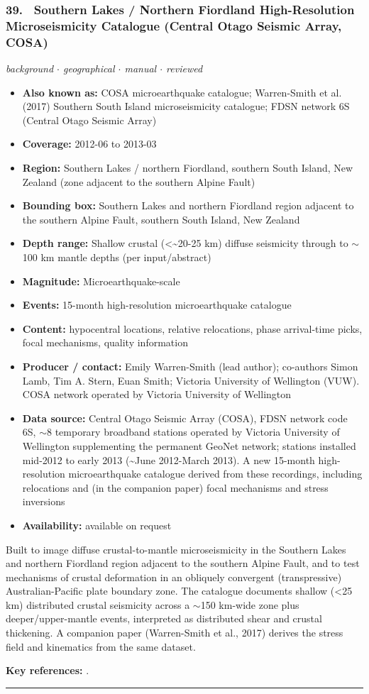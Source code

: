 \documentclass[10pt,a4paper]{article}
\newcommand{\catentryrule}{\par\vspace{3pt}\noindent\textcolor{rulegrey}{\rule{\linewidth}{0.3pt}}\par\vspace{5pt}}
\newcommand{\kv}[2]{\item \textbf{#1:} #2}
\begin{document}
\subsubsection*{\hypertarget{c:39}{39.}~ Southern Lakes / Northern Fiordland High-Resolution Microseismicity Catalogue (Central Otago Seismic Array, COSA)}
{\small\itshape background $\cdot$ geographical $\cdot$ manual $\cdot$ reviewed}\par\vspace{2pt}
\begin{itemize}[leftmargin=1.3em,itemsep=0.6pt,topsep=1pt,parsep=0pt]
\kv{Also known as}{COSA microearthquake catalogue; Warren-Smith et al. (2017) Southern South Island microseismicity catalogue; FDSN network 6S (Central Otago Seismic Array)}
\kv{Coverage}{2012-06 to 2013-03}
\kv{Region}{Southern Lakes / northern Fiordland, southern South Island, New Zealand (zone adjacent to the southern Alpine Fault)}
\kv{Bounding box}{Southern Lakes and northern Fiordland region adjacent to the southern Alpine Fault, southern South Island, New Zealand}
\kv{Depth range}{Shallow crustal (\textless{}\textasciitilde{}20-25 km) diffuse seismicity through to $\sim$100 km mantle depths (per input/abstract)}
\kv{Magnitude}{Microearthquake-scale}
\kv{Events}{15-month high-resolution microearthquake catalogue}
\kv{Content}{hypocentral locations, relative relocations, phase arrival-time picks, focal mechanisms, quality information}
\kv{Producer / contact}{Emily Warren-Smith (lead author); co-authors Simon Lamb, Tim A. Stern, Euan Smith; Victoria University of Wellington (VUW). COSA network operated by Victoria University of Wellington}
\kv{Data source}{Central Otago Seismic Array (COSA), FDSN network code 6S, $\sim$8 temporary broadband stations operated by Victoria University of Wellington supplementing the permanent GeoNet network; stations installed mid-2012 to early 2013 (\textasciitilde{}June 2012-March 2013). A new 15-month high-resolution microearthquake catalogue derived from these recordings, including relocations and (in the companion paper) focal mechanisms and stress inversions}
\kv{Availability}{available on request}
\end{itemize}
\par\vspace{2pt}Built to image diffuse crustal-to-mantle microseismicity in the Southern Lakes and northern Fiordland region adjacent to the southern Alpine Fault, and to test mechanisms of crustal deformation in an obliquely convergent (transpressive) Australian-Pacific plate boundary zone. The catalogue documents shallow (\textless{}25 km) distributed crustal seismicity across a $\sim$150 km-wide zone plus deeper/upper-mantle events, interpreted as distributed shear and crustal thickening. A companion paper (Warren-Smith et al., 2017) derives the stress field and kinematics from the same dataset.
\par\vspace{2pt}\textbf{Key references:} \cite{WarrenSmith2017a,WarrenSmith2017b,VictoriaUniversityofWellington2012}.
\catentryrule
\end{document}
